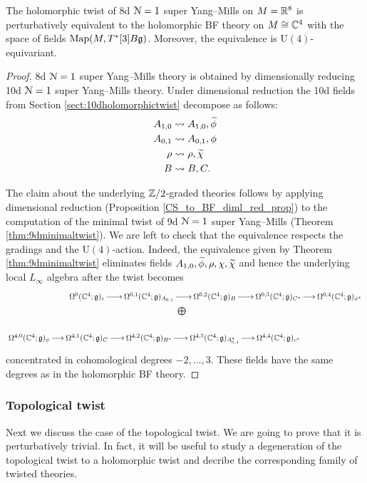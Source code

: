 \documentclass[10pt, oneside]{article}
\renewcommand{\U}{\mathrm{U}}
\begin{document}
\begin{thm}
The holomorphic twist of 8d $\mathcal N=1$ super Yang--Mills on $M=\mathbb R^8$ is perturbatively equivalent to the holomorphic BF theory on $M\cong\mathbb C^4$ with the space of fields $\operatorname{Map}(M, T^*[3] B\mathfrak g)$. Moreover, the equivalence is $\U(4)$-equivariant.
\label{thm:8dholomorphictwist}
\end{thm}
\begin{proof}
8d $\mathcal N=1$ super Yang--Mills theory is obtained by dimensionally reducing 10d $\mathcal N=1$ super Yang--Mills theory. Under dimensional reduction the 10d fields from Section \ref{sect:10dholomorphictwist} decompose as follows:
\begin{align*}
A_{1, 0}&\rightsquigarrow A_{1, 0}, \widetilde{\phi} \\
A_{0, 1}&\rightsquigarrow A_{0, 1}, \phi \\
\rho&\rightsquigarrow \rho, \widetilde{\chi} \\
B&\rightsquigarrow B, C.
\end{align*}

The claim about the underlying $\mathbb Z/2$-graded theories follows by applying dimensional reduction (Proposition \ref{CS_to_BF_diml_red_prop}) to the computation of the minimal twist of 9d $\mathcal N=1$ super Yang--Mills (Theorem \ref{thm:9dminimaltwist}). We are left to check that the equivalence respects  the gradings and the $\U(4)$-action. Indeed, the equivalence given by Theorem \ref{thm:9dminimaltwist} eliminates fields $A_{1, 0}, \widetilde{\phi}, \rho, \chi, \widetilde{\chi}$ and hence the underlying local $L_\infty$ algebra after the twist becomes
\[
\xymatrix@R=0.5cm@C=0.5cm{
&\Omega^0(\CC^4; \gg)_c \ar[r] &\Omega^{0,1}(\CC^4; \gg)_{A_{0,1}} \ar[r] &\Omega^{0,2}(\CC^4; \gg)_{B} \ar[r] &\Omega^{0,3}(\CC^4; \gg)_{C^*} \ar[r] &\Omega^{0,4}(\CC^4; \gg)_{\phi^*} \\
&&\ar@{}^{\bigoplus}[r] &&& \\
\Omega^{4,0}(\CC^4; \gg)_{\phi} \ar[r] &\Omega^{4,1}(\CC^4; \gg)_C \ar[r] &\Omega^{4,2}(\CC^4; \gg)_{B^*} \ar[r] &\Omega^{4,3}(\CC^4; \gg)_{A_{0,1}^*} \ar[r] &\Omega^{4,4}(\CC^4; \gg)_{c^*}&
}
\]
concentrated in cohomological degrees $-2, \dots, 3$. These fields have the same degrees as in the holomorphic BF theory.
\end{proof}

\subsubsection{Topological twist}

Next we discuss the case of the topological twist. We are going to prove that it is perturbatively trivial. In fact, it will be useful to study a degeneration of the topological twist to a holomorphic twist and decribe the corresponding family of twisted theories.
\end{document}
